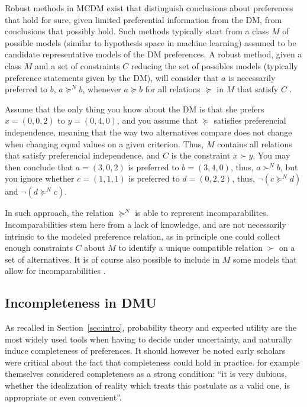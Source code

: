 \documentclass[version=last, pagesize, twocolumn, twoside=off, bibliography=totoc, 12pt, a4paper, english]{scrartcl}
\begin{document}
Robust methods in MCDM exist that distinguish conclusions about preferences that hold for sure, given limited preferential information from the \ac{DM}, from conclusions that possibly hold. Such methods typically start from a class $M$ of possible models (similar to hypothesis space in machine learning) assumed to be candidate representative models of the \ac{DM} preferences. A robust method, given a class $M$ and a set of constraints $C$ reducing the set of possibles models (typically preference statements given by the \ac{DM}), will consider that $a$ is necessarily preferred to $b$, $a \succeq^N b$, whenever $a \succeq b$ for all relations $\succeq$ in $M$ that satisfy $C$ \citep{greco_ordinal_2008}.
\begin{example} 
Assume that the only thing you know about the \ac{DM} is that she prefers $x = (0, 0, 2)$ to $y = (0, 4, 0)$, and you assume that $\succeq$ satisfies preferencial independence, meaning that the way two alternatives compare does not change when changing equal values on a given criterion. Thus, $M$ contains all relations that satisfy preferencial independence, and $C$ is the constraint $x \succ y$. You may then conclude that $a = (3, 0, 2)$ is preferred to $b = (3, 4, 0)$, thus, $a \succ^N b$, but you ignore whether $c = (1, 1, 1)$ is preferred to $d = (0, 2, 2)$, thus, $¬(c \succeq^N d)$ and $¬(d \succeq^N c)$.
\end{example} 
In such approach, the relation $\succeq^N$ is able to represent incomparabilites. Incomparabilities stem here from a lack of knowledge, and are not necessarily intrinsic to the modeled preference relation, as in principle one could collect enough constraints $C$ about $M$ to identify a unique compatible relation $\succ$ on a set of alternatives. It is of course also possible to include in $M$ some models that allow for incomparabilities \citep{greco_electregkms:_2011}.

\subsection{Incompleteness in DMU}

As recalled in Section~\ref{sec:intro}, probability theory and expected utility are the most widely used tools when having to decide under uncertainty, and naturally induce completeness of preferences. It should however be noted early scholars were critical about the fact that completeness could hold in practice. 
\citet[p. 630]{von_neumann_theory_1953} for example themselves considered completeness as a strong condition: “it is very dubious, whether the idealization of reality which treats this postulate as a valid one, is appropriate or even convenient”.
\end{document}
